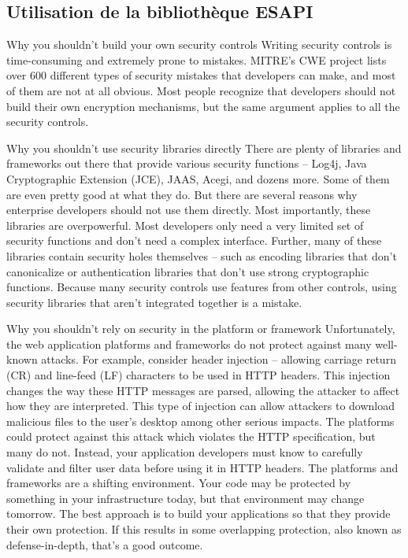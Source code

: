 \subsection{Utilisation de la bibliothèque ESAPI}
Why you shouldn’t build your own security controls
Writing security controls is time-consuming and extremely prone to mistakes. MITRE’s CWE project lists
over 600 different types of security mistakes that developers can make, and most of them are not at all
obvious. Most people recognize that developers should not build their own encryption mechanisms, but
the same argument applies to all the security controls.

Why you shouldn’t use security libraries directly
There are plenty of libraries and frameworks out there that provide various security functions – Log4j,
Java Cryptographic Extension (JCE), JAAS, Acegi, and dozens more. Some of them are even pretty good
at what they do. But there are several reasons why enterprise developers should not use them directly.
Most importantly, these libraries are overpowerful. Most developers only need a very limited set of
security functions and don’t need a complex interface. Further, many of these libraries contain security
holes themselves – such as encoding libraries that don’t canonicalize or authentication libraries that
don’t use strong cryptographic functions. Because many security controls use features from other
controls, using security libraries that aren’t integrated together is a mistake.

Why you shouldn’t rely on security in the platform or framework
Unfortunately, the web application platforms and frameworks do not protect against many well-known
attacks. For example, consider header injection – allowing carriage return (CR) and line-feed (LF)
characters to be used in HTTP headers. This injection changes the way these HTTP messages are parsed,
allowing the attacker to affect how they are interpreted. This type of injection can allow attackers to download malicious files to the user’s desktop among other serious impacts.
The platforms could protect against this attack which violates the HTTP specification, but many do not. Instead, your application developers must know to carefully validate and filter user data before using it in HTTP headers.
The platforms and frameworks are a shifting environment. Your code may be protected by something in
your infrastructure today, but that environment may change tomorrow. The best approach is to build
your applications so that they provide their own protection. If this results in some overlapping
protection, also known as defense-in-depth, that’s a good outcome. 

